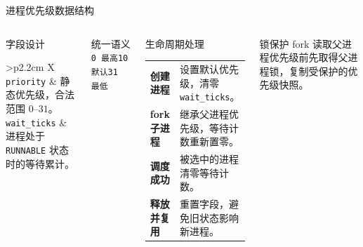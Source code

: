 \documentclass[aspectratio=169,10pt]{beamer}
\newcommand{\code}[1]{{\texttt{\small #1}}}
\newcommand{\pill}[1]{\colorbox{dutSky}{\textcolor{dutBlueDark}{\texttt{#1}}}}
\begin{document}
\begin{dutframe}{}{进程优先级数据结构}
  \begin{columns}[T,totalwidth=\textwidth]
      \begin{dutsection}{字段设计}
        \begin{tabularx}{\linewidth}{>{\bfseries\color{dutBlueDark}}p{2.2cm} X}
          \code{priority} & 静态优先级，合法范围 $0$--$31$。 \\
          \code{wait\_ticks} & 进程处于 \code{RUNNABLE} 状态时的等待累计。
        \end{tabularx}
      \end{dutsection}
      \vspace{0.28cm}
      \begin{dutsection}{统一语义}
        \centering
        \pill{0 最高}\quad\pill{10 默认}\quad\pill{31 最低}
      \end{dutsection}
      \begin{dutsection}{生命周期处理}
        \small
        \begin{tabularx}{\linewidth}{>{\bfseries\color{dutBlueDark}}p{2.15cm} X}
          创建进程 & 设置默认优先级，清零 \code{wait\_ticks}。 \\
          fork 子进程 & 继承父进程优先级，等待计数重新置零。 \\
          调度成功 & 被选中的进程清零等待计数。 \\
          释放并复用 & 重置字段，避免旧状态影响新进程。
        \end{tabularx}
      \end{dutsection}
      \vspace{0.22cm}
      \begin{dutsection}{锁保护}
        \small
        fork 读取父进程优先级前先取得父进程锁，复制受保护的优先级快照。
      \end{dutsection}
  \end{columns}
\end{dutframe}
\end{document}
